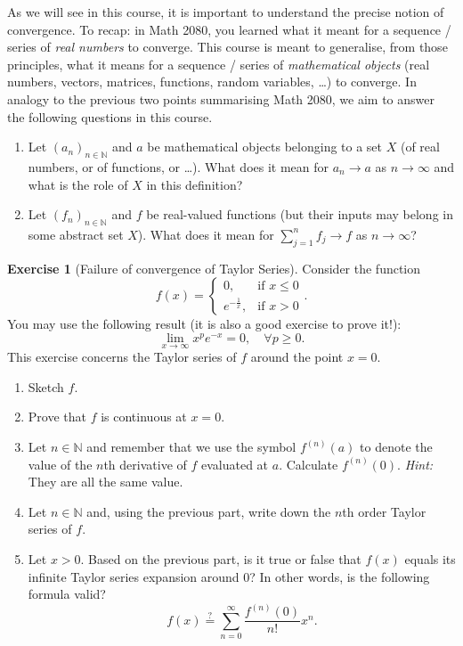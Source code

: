 \documentclass[12pt]{book}
\newcommand{\N}{\mathbb{N}}
\theoremstyle{remark}
\theoremstyle{definition}
\newtheorem{ex}{Exercise}[section]
\begin{document}
	As we will see in this course, it is important to understand the precise notion of convergence. To recap: in Math 2080, you learned what it meant for a sequence / series of \textit{real numbers} to converge. This course is meant to generalise, from those principles, what it means for a sequence / series of \textit{mathematical objects} (real numbers, vectors, matrices, functions, random variables, \dots) to converge. In analogy to the previous two points summarising Math 2080, we aim to answer the following questions in this course.
	\begin{enumerate}
		\item Let $(a_n)_{n\in\N}$ and $a$ be mathematical objects belonging to a set $X$ (of real numbers, or of functions, or \dots). What does it mean for $a_n \to a$ as $n\to \infty$ and what is the role of $X$ in this definition?
		\item Let $(f_n)_{n\in\N}$ and $f$ be real-valued functions (but their inputs may belong in some abstract set $X$). What does it mean for $\sum_{j=1}^nf_j\to f$ as $n\to \infty$?
	\end{enumerate}
	\begin{ex}[Failure of convergence of Taylor Series]
	Consider the function
	\[
	f(x) = \left\{
	\begin{array}{cl}
		0,	&\text{if }x\le 0 	\\
		e^{-\frac{1}{x}},	&\text{if }x>0
	\end{array}
	\right..
	\]
	You may use the following result (it is also a good exercise to prove it!):
	\begin{equation}
		\label{eq:intro_seq_exp}
		\lim_{x\to \infty} x^p e^{-x} = 0,\quad \forall p\ge 0.
	\end{equation}
	This exercise concerns the Taylor series of $f$ around the point $x=0$.
	\begin{enumerate}
		\item Sketch $f$.
		\item Prove that $f$ is continuous at $x=0$.
		\item Let $n\in\N$ and remember that we use the symbol $f^{(n)}(a)$ to denote the value of the $n$th derivative of $f$ evaluated at $a$. Calculate $f^{(n)}(0)$. \textit{Hint: }They are all the same value.
		\item Let $n\in\N$ and, using the previous part, write down the $n$th order Taylor series of $f$.
		\item Let $x>0$. Based on the previous part, is it true or false that $f(x)$ equals its infinite Taylor series expansion around 0? In other words, is the following formula valid?
		\[
		f(x) \overset{?}{=} \sum_{n=0}^\infty \frac{f^{(n)}(0)}{n!}x^n.
		\]
	\end{enumerate}
	\end{ex}
\end{document}

